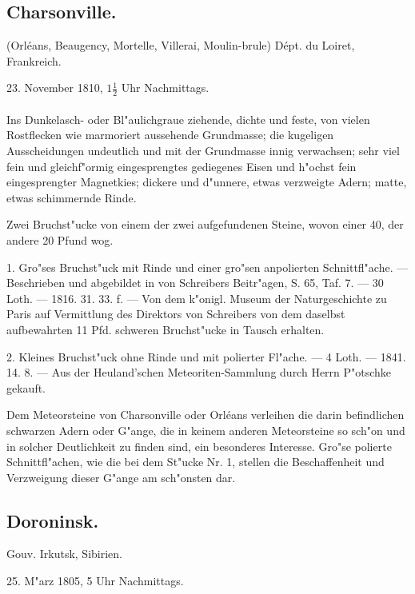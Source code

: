 \documentclass[a4paper, 11pt, oneside, polutonikogreek, german]{article}
\begin{document}
\subsection{Charsonville.}
\begin{center}
\small
(Orléans, Beaugency, Mortelle, Villerai, Moulin-brule) Dépt. du Loiret, Frankreich.

23. November 1810, $1\frac{1}{2}$ Uhr Nachmittags.
\end{center}
\paragraph{}
Ins Dunkelasch- oder Bl"aulichgraue ziehende, dichte und feste, von vielen Rostflecken wie marmoriert aussehende Grundmasse; die kugeligen Ausscheidungen undeutlich und mit der Grundmasse innig verwachsen; sehr viel fein und gleichf"ormig eingesprengtes gediegenes Eisen und h"ochst fein eingesprengter Magnetkies; dickere und d"unnere, etwas verzweigte Adern; matte, etwas schimmernde Rinde.

Zwei Bruchst"ucke von einem der zwei aufgefundenen Steine, wovon einer 40, der andere 20 Pfund wog.

1. Gro"ses Bruchst"uck mit Rinde und einer gro"sen anpolierten Schnittfl"ache. --- Beschrieben und abgebildet in von Schreibers Beitr"agen, S. 65, Taf. 7. --- 30 Loth. --- 1816. 31. 33. f. --- Von dem k"onigl. Museum der Naturgeschichte zu Paris auf Vermittlung des Direktors von Schreibers von dem daselbst aufbewahrten 11 Pfd. schweren Bruchst"ucke in Tausch erhalten.

2. Kleines Bruchst"uck ohne Rinde und mit polierter Fl"ache. --- 4 Loth. --- 1841. 14. 8. --- Aus der Heuland'schen Meteoriten-Sammlung durch Herrn P"otschke gekauft.

\setlength{\leftskip}{10mm}
\setlength{\parindent}{0pt}

{\footnotesize Dem Meteorsteine von Charsonville oder Orléans verleihen die darin befindlichen schwarzen Adern oder G"ange, die in keinem anderen Meteorsteine so sch"on und in solcher Deutlichkeit zu finden sind, ein besonderes Interesse. Gro"se polierte Schnittfl"achen, wie die bei dem St"ucke Nr. 1, stellen die Beschaffenheit und Verzweigung dieser G"ange am sch"onsten dar.}

\setlength{\leftskip}{0pt}
\setlength{\parindent}{20pt}

\subsection{Doroninsk.}
\begin{center}
\small
Gouv. Irkutsk, Sibirien.

25. M"arz 1805, 5 Uhr Nachmittags.
\end{center}
\end{document}
